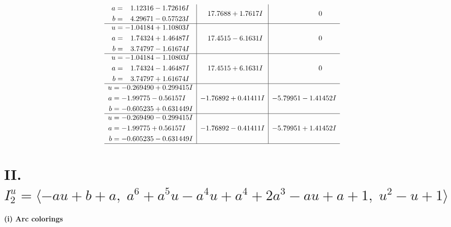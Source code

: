 \documentclass[1p]{elsarticle_modified}
\theoremstyle{definition}
\begin{document}
$$\begin{array}{c|c|c}
\begin{aligned}
a &= \phantom{-}1.12316 - 1.72616 I \\
b &= \phantom{-}4.29671 - 0.57523 I\end{aligned}
 & \phantom{-}17.7688 + 1.7617 I & \phantom{-0.000000 } 0 \\ \hline\begin{aligned}
u &= -1.04184 + 1.10803 I \\
a &= \phantom{-}1.74324 + 1.46487 I \\
b &= \phantom{-}3.74797 - 1.61674 I\end{aligned}
 & \phantom{-}17.4515 - 6.1631 I & \phantom{-0.000000 } 0 \\ \hline\begin{aligned}
u &= -1.04184 - 1.10803 I \\
a &= \phantom{-}1.74324 - 1.46487 I \\
b &= \phantom{-}3.74797 + 1.61674 I\end{aligned}
 & \phantom{-}17.4515 + 6.1631 I & \phantom{-0.000000 } 0 \\ \hline\begin{aligned}
u &= -0.269490 + 0.299415 I \\
a &= -1.99775 - 0.56157 I \\
b &= -0.605235 + 0.631449 I\end{aligned}
 & -1.76892 + 0.41411 I & -5.79951 - 1.41452 I \\ \hline\begin{aligned}
u &= -0.269490 - 0.299415 I \\
a &= -1.99775 + 0.56157 I \\
b &= -0.605235 - 0.631449 I\end{aligned}
 & -1.76892 - 0.41411 I & -5.79951 + 1.41452 I\\
 \hline 
 \end{array}$$\newpage\newpage\renewcommand{\arraystretch}{1}
\centering \section*{II. $I^u_{2}= \langle - a u+b+a,\;a^6+a^5 u- a^4 u+a^4+2 a^3- a u+a+1,\;u^2- u+1 \rangle$}
\flushleft \textbf{(i) Arc colorings}\\
\end{document}
